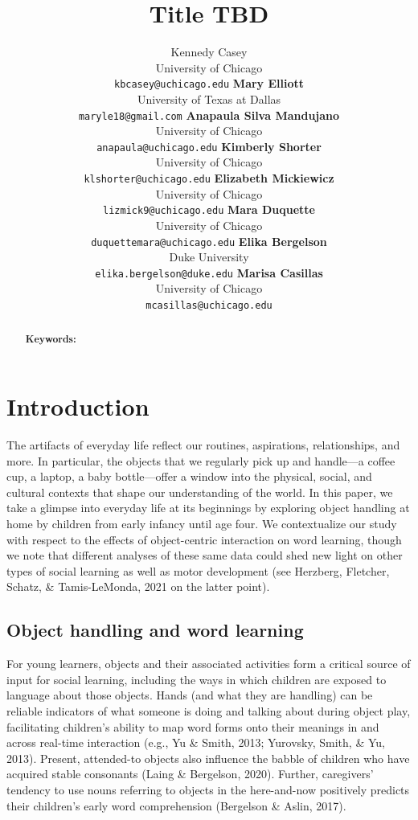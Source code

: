 \documentclass[10pt, letterpaper]{article}
\title{Title TBD}
\author{Kennedy Casey \\
        University of Chicago \\
        \texttt{\small{kbcasey@uchicago.edu}}
\And \textbf{Mary Elliott} \\
             University of Texas at Dallas \\
             \texttt{\small{maryle18@gmail.com}}
\And \textbf{Anapaula Silva Mandujano} \\
             University of Chicago \\
             \texttt{\small{anapaula@uchicago.edu}}   
\And \textbf{Kimberly Shorter} \\
             University of Chicago \\
             \texttt{\small{klshorter@uchicago.edu}}
\AND \textbf{Elizabeth Mickiewicz} \\
             University of Chicago \\
             \texttt{\small{lizmick9@uchicago.edu}}         
\And \textbf{Mara Duquette} \\
             University of Chicago \\
             \texttt{\small{duquettemara@uchicago.edu}}
\And \textbf{Elika Bergelson} \\
             Duke University \\
             \texttt{\small{elika.bergelson@duke.edu}}
\And \textbf{Marisa Casillas} \\
             University of Chicago \\
             \texttt{\small{mcasillas@uchicago.edu}}}
\begin{document}
\maketitle

\begin{abstract}


\textbf{Keywords:}

\end{abstract}

\hypertarget{introduction}{%
\section{Introduction}\label{introduction}}

The artifacts of everyday life reflect our routines, aspirations,
relationships, and more. In particular, the objects that we regularly
pick up and handle---a coffee cup, a laptop, a baby bottle---offer a
window into the physical, social, and cultural contexts that shape our
understanding of the world. In this paper, we take a glimpse into
everyday life at its beginnings by exploring object handling at home by
children from early infancy until age four. We contextualize our study
with respect to the effects of object-centric interaction on word
learning, though we note that different analyses of these same data
could shed new light on other types of social learning as well as motor
development (see Herzberg, Fletcher, Schatz, \& Tamis-LeMonda, 2021 on
the latter point).

\hypertarget{object-handling-and-word-learning}{%
\subsection{Object handling and word
learning}\label{object-handling-and-word-learning}}

For young learners, objects and their associated activities form a
critical source of input for social learning, including the ways in
which children are exposed to language about those objects. Hands (and
what they are handling) can be reliable indicators of what someone is
doing and talking about during object play, facilitating children's
ability to map word forms onto their meanings in and across real-time
interaction (e.g., Yu \& Smith, 2013; Yurovsky, Smith, \& Yu, 2013).
Present, attended-to objects also influence the babble of children who
have acquired stable consonants (Laing \& Bergelson, 2020). Further,
caregivers' tendency to use nouns referring to objects in the
here-and-now positively predicts their children's early word
comprehension (Bergelson \& Aslin, 2017).
\end{document}
